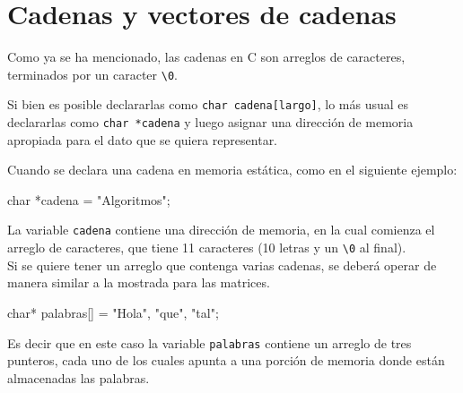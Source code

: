 \section{Cadenas y vectores de cadenas}

Como ya se ha mencionado, las cadenas en C son arreglos de caracteres,
terminados por un caracter \lstinline!\0!.

Si bien es posible declararlas como \lstinline!char cadena[largo]!, lo más
usual es declararlas como \lstinline!char *cadena! y luego asignar una
dirección de memoria apropiada para el dato que se quiera representar.

Cuando se declara una cadena en memoria estática, como en el siguiente
ejemplo:

\begin{codigo-c-plano}
char *cadena = "Algoritmos";
\end{codigo-c-plano}

La variable \lstinline!cadena! contiene una dirección de memoria, en la
cual comienza el arreglo de caracteres, que tiene 11 caracteres (10 letras
y un \lstinline!\0! al final). \\

Si se quiere tener un arreglo que contenga varias cadenas, se deberá operar
de manera similar a la mostrada para las matrices.

\begin{codigo-c-plano}
    char* palabras[] = {"Hola", "que", "tal"};
\end{codigo-c-plano}

Es decir que en este caso la variable \lstinline!palabras! contiene un
arreglo de tres punteros, cada uno de los cuales apunta a una porción de
memoria donde están almacenadas las palabras.



